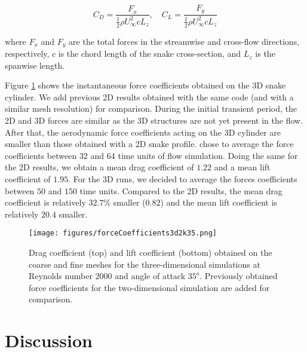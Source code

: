 \documentclass[12pt]{article}
\begin{document}
\begin{equation}
	C_D = \frac{F_x}{\frac{1}{2} \rho U_\infty^2 c L_z},\quad C_L = \frac{F_y}{\frac{1}{2} \rho U_\infty^2 c L_z}
\end{equation}

\noindent where $F_x$ and $F_y$ are the total forces in the streamwise and cross-flow directions, respectively, $c$ is the chord length of the snake cross-section, and $L_z$ is the spanwise length.

Figure \ref{force_coefficients_3d2k35_azure} shows the instantaneous force coefficients obtained on the 3D snake cylinder.
We add previous 2D results obtained with the same code (and with a similar mesh resolution) for comparison.
During the initial transient period, the 2D and 3D forces are similar as the 3D structures are not yet present in the flow.
After that, the aerodynamic force coefficients acting on the 3D cylinder are smaller than those obtained with a 2D snake profile.
\cite{Krishnan_et_al_2014} chose to average the force coefficients between $32$ and $64$ time units of flow simulation.
Doing the same for the 2D results, we obtain a mean drag coefficient of $1.22$ and a mean lift coefficient of $1.95$.
For the 3D runs, we decided to average the forces coefficients between $50$ and $150$ time units.
Compared to the 2D results, the mean drag coefficient is relatively $32.7\%$ smaller ($0.82$) and the mean lift coefficient is relatively $20.4$ smaller.

\begin{figure}[h!]
\centering
\texttt{[image: figures/forceCoefficients3d2k35.png]}
\caption{Drag coefficient (top) and lift coefficient (bottom) obtained on the coarse and fine meshes for the three-dimensional simulations at Reynolds number $2000$ and angle of attack $35^o$. Previously obtained force coefficients for the two-dimensional simulation are added for comparison.}
\label{force_coefficients_3d2k35_azure}
\end{figure}

\section{Discussion}
\end{document}
